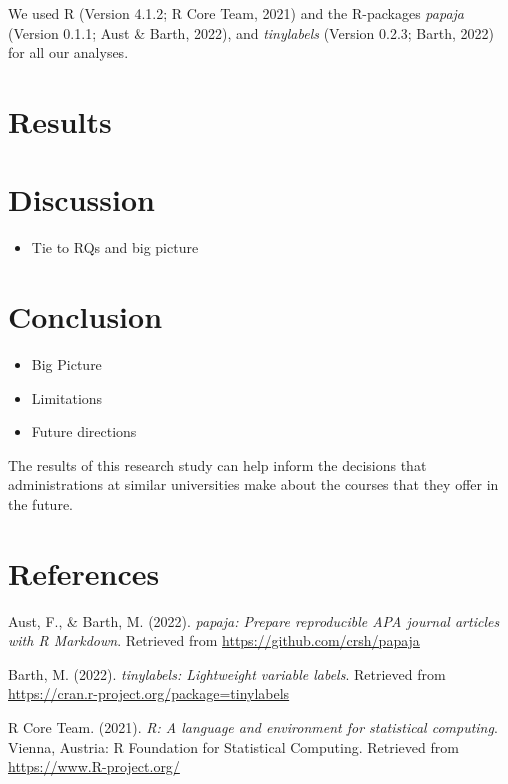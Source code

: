 \documentclass[
  man]{apa6}
\providecommand{\tightlist}{%
  \setlength{\itemsep}{0pt}\setlength{\parskip}{0pt}}
\newlength{\cslhangindent}
\newlength{\cslentryspacingunit} %
\newenvironment{CSLReferences}[2] %
 {%
  \setlength{\parindent}{0pt}
  \ifodd #1
  \let\oldpar\par
  \def\par{\hangindent=\cslhangindent\oldpar}
  \fi
  \setlength{\parskip}{#2\cslentryspacingunit}
 }%
 {}
\begin{document}
We used R (Version 4.1.2; R Core Team, 2021) and the R-packages \emph{papaja} (Version 0.1.1; Aust \& Barth, 2022), and \emph{tinylabels} (Version 0.2.3; Barth, 2022) for all our analyses.

\hypertarget{results}{%
\section{Results}\label{results}}

\hypertarget{discussion}{%
\section{Discussion}\label{discussion}}

\begin{itemize}
\tightlist
\item
  Tie to RQs and big picture
\end{itemize}

\hypertarget{conclusion}{%
\section{Conclusion}\label{conclusion}}

\begin{itemize}
\item
  Big Picture
\item
  Limitations
\item
  Future directions
\end{itemize}

The results of this research study can help inform the decisions that administrations at similar universities make about the courses that they offer in the future.

\newpage

\hypertarget{references}{%
\section{References}\label{references}}

\hypertarget{refs}{}
\begin{CSLReferences}{1}{0}
\leavevmode{}%
Aust, F., \& Barth, M. (2022). \emph{{papaja}: {Prepare} reproducible {APA} journal articles with {R Markdown}}. Retrieved from \url{https://github.com/crsh/papaja}

\leavevmode{}%
Barth, M. (2022). \emph{{tinylabels}: Lightweight variable labels}. Retrieved from \url{https://cran.r-project.org/package=tinylabels}

\leavevmode{}%
R Core Team. (2021). \emph{R: A language and environment for statistical computing}. Vienna, Austria: R Foundation for Statistical Computing. Retrieved from \url{https://www.R-project.org/}

\end{CSLReferences}
\end{document}
